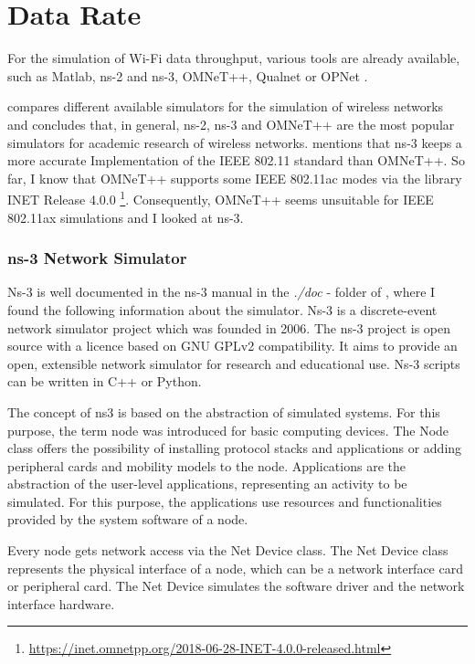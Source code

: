 \section{Data Rate}
\label{sec:DataRate}
For the simulation of Wi-Fi data throughput, various tools are already available, such as Matlab, ns-2 and ns-3, OMNeT++, Qualnet \cite{keller_simulation_2021} or OPNet \cite{kumar_simulators_2012}.

\textcite{kumar_simulators_2012} compares different available simulators for the simulation of wireless networks and concludes that, in general, ns-2, ns-3 and OMNeT++ are the most popular simulators for academic research of wireless networks.
\textcite{keller_simulation_2021} mentions that ns-3 keeps a more accurate Implementation of the IEEE 802.11 standard than OMNeT++.
So far, I know that OMNeT++ supports some IEEE 802.11ac modes via the library INET Release 4.0.0 \footnote{\url{https://inet.omnetpp.org/2018-06-28-INET-4.0.0-released.html}}.
Consequently, OMNeT++ seems unsuitable for IEEE 802.11ax simulations and I looked at ns-3.


\subsubsection*{ns-3 Network Simulator}

Ns-3 is well documented in the ns-3 manual in the \textit{./doc} - folder of  \cite{henderson_ns-3-dev_2023}, where I found the following information about the simulator.
Ns-3 is a discrete-event network simulator project which was founded in 2006.
The ns-3 project is open source with a licence based on GNU GPLv2 compatibility.
It aims to provide an open, extensible network simulator for research and educational use.
Ns-3 scripts can be written in C++ or Python.

The concept of ns3 is based on the abstraction of simulated systems.
For this purpose, the term node was introduced for basic computing devices.
The Node class offers the possibility of installing protocol stacks and applications or adding peripheral cards and mobility models to the node.
Applications are the abstraction of the user-level applications, representing an activity to be simulated.
For this purpose, the applications use resources and functionalities provided by the system software of a node.

Every node gets network access via the Net Device class.
The Net Device class represents the physical interface of a node,
which can be a network interface card or peripheral card.
The Net Device simulates the software driver and the network interface hardware.


